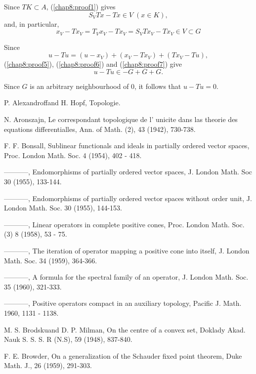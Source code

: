 Since $T K \subset A$, (\ref{chap8:proof1}) gives 
$$
S_V Tx - Tx \in V \; (x \in K),
$$
and, in particular,
\begin{equation*}
  x_V - Tx_V = T_V x_V - Tx_V = S_V Tx_V - Tx_V \in V \subset G
  \tag{7}\label{chap8:proof7} 
\end{equation*}

Since
$$
  u - Tu = (u - x_V) + (x_V - Tx_V) + (Tx_V - Tu),
$$
(\ref{chap8:proof5}), (\ref{chap8:proof6}) and (\ref{chap8:proof7}) give
$$
u - Tu \in - G + G + G.
$$

Since $G$ is an arbitrary neighbourhood of 0, it follows that $u -
Tu = 0$. 
 
\begin{thebibliography}{99}
 {P. Alexandroff\pageoriginale and H. Hopf}, Topologie.

 {N. Aronszajn}, Le correspondant topologique de l'
  unicite dans las theorie des equations differentialles, Ann. of
  Math. (2), 43 (1942), 730-738. 

 {F. F. Bonsall}, Sublinear functionals and ideals in
  partially ordered vector spaces, Proc. London Math. Soc. 4 (1954),
  402 - 418. 

 {-----------}, Endomorphisms of partially ordered vector
  spaces, J. London Math. Soc 30 (1955), 133-144. 

 {-----------}, Endomorphisms of partially ordered vector
  spaces without order unit, J. London Math. Soc. 30 (1955),
  144-153. 

 {-----------}, Linear operators in complete positive
  cones, Proc. London Math. Soc. (3) 8 (1958), 53 - 75. 

 {-----------}, The iteration of operator mapping a
  positive cone into itself, J. London Math. Soc. 34 (1959),
  364-366. 

 {-----------}, A formula for the spectral family of an
  operator, J. London Math. Soc. 35 (1960), 321-333. 

 {-----------}, Positive operators compact in an auxiliary
  topology, Pacific J. Math. 1960, 1131 - 1138. 

 {M. S. Brodsku\pageoriginale and D. P. Milman}, On the
  centre of a   convex set, Doklady Akad. Nauk S. S. S. R (N.S),  59
  (1948), 837-840. 

 {F. E. Browder}, On a generalization of the Schauder
  fixed point theorem, Duke Math. J., 26 (1959), 291-303. 


\end{thebibliography}
